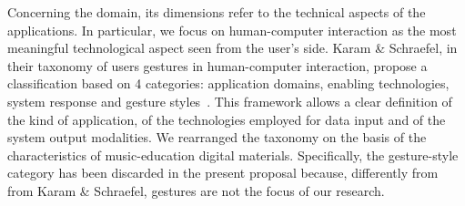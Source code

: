 \documentclass[journal]{IEEEtran}
\newcommand{\domain}[1]{{\fontfamily{cmss}\selectfont {\textsc{#1}}}}
\begin{document}
Concerning the \domain{Technological} domain, its dimensions refer to the technical aspects of the applications. In particular, we focus on human-computer interaction as the most meaningful technological aspect seen from the user's side. Karam \& Schraefel, in their taxonomy of users gestures in human-computer interaction, propose a classification based on 4 categories: application domains, enabling technologies, system response and gesture styles~\cite{karam2005taxonomy}. This framework allows a clear definition of the kind of application, of the technologies employed for data input and of the system output modalities. We rearranged the taxonomy on the basis of the characteristics of music-education digital materials. Specifically, the gesture-style category has been discarded in the present proposal because, differently from from Karam \& Schraefel, gestures are not the focus of our research. 
\end{document}
